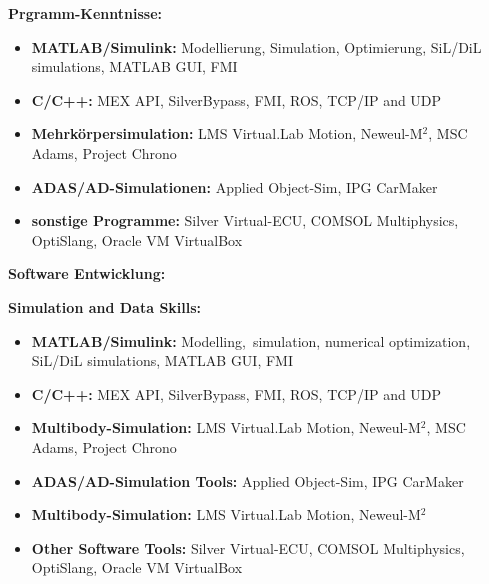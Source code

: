 \documentclass{mycv}
\begin{document}
\begin{paracol}{2}
    {
        {\bfseries Prgramm-Kenntnisse:}
        \begin{itemize}
            \item {\bfseries MATLAB/Simulink:} Modellierung, Simulation,
                Optimierung, SiL/DiL simulations, MATLAB GUI, FMI
            \item {\bfseries C/C++:} MEX API, SilverBypass, FMI, ROS, TCP/IP and UDP
            \item{\bfseries Mehrk{\"o}rpersimulation:}  LMS Virtual.Lab Motion, Neweul-M$^2$, 
                MSC Adams, Project Chrono
            \item{\bfseries ADAS/AD-Simulationen:} Applied Object-Sim, IPG CarMaker
            \item {\bfseries sonstige Programme:}  Silver Virtual-ECU, COMSOL
                Multiphysics, OptiSlang, Oracle VM VirtualBox
        \end{itemize} \par

        {\bfseries Software Entwicklung:}\par
    }
    {
        {\bfseries Simulation and Data Skills:}
        \begin{itemize}
            \item {\bfseries MATLAB/Simulink:} Modelling, \,simulation,
                numerical optimization, SiL/DiL simulations, MATLAB GUI, FMI
            \item {\bfseries C/C++:} MEX API, SilverBypass, FMI, ROS, TCP/IP and UDP
            \item{\bfseries Multibody-Simulation:}  LMS Virtual.Lab Motion, Neweul-M$^2$, 
                MSC Adams, Project Chrono
            \item{\bfseries ADAS/AD-Simulation Tools:}  Applied Object-Sim, IPG CarMaker
            \item{\bfseries Multibody-Simulation:}  LMS Virtual.Lab Motion, Neweul-M$^2$
            \item {\bfseries Other Software Tools:}  Silver Virtual-ECU, COMSOL
                Multiphysics, OptiSlang, Oracle VM VirtualBox
        \end{itemize} \par

}
\end{paracol}
\end{document}
